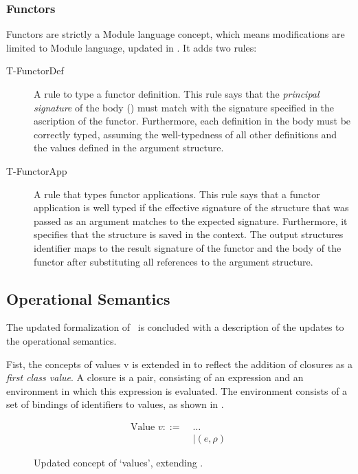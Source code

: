 \subsubsection{Functors}
Functors are strictly a Module language concept, which means modifications are limited to Module language, updated in .
It adds two rules:
\begin{description}
\item[T-FunctorDef]
A rule to type a functor definition.
This rule says that the \emph{principal signature} of the body () must match with the signature specified in the ascription of the functor.
Furthermore, each definition in the body must be correctly typed, assuming the well-typedness of all other definitions and the values defined in the argument structure. 
\item[T-FunctorApp]
A rule that types functor applications.
This rule says that a functor application is well typed if the effective signature of the structure that was passed as an argument matches to the expected signature.
Furthermore, it specifies that the structure is saved in the context.
The output structures identifier maps to the result signature of the functor and the body of the functor after substituting all references to the argument structure.
\end{description}



\subsection{Operational Semantics}
The updated formalization of \MiniML\ is concluded with a description of the updates to the operational semantics.

Fist, the concepts of values v is extended in  to reflect the addition of closures as a \emph{first class value}.
A closure is a pair, consisting of an expression and an environment in which this expression is evaluated.
The environment consists of a set of bindings of identifiers to values, as shown in .

\begin{figure}[htb]
\begin{align*}
\text{Value }v ::=\;& \ldots \\
&| (e, \rho)\ 
\end{align*}
\caption[Updated Value Concept]{Updated concept of `values', extending .\label{fig:UpdatedValues}}
\end{figure}

